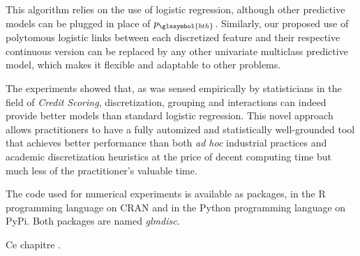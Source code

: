 This algorithm relies on the use of logistic regression, although other predictive models can be plugged in place of $p_{\glssymbol{bth}}$. Similarly, our proposed use of polytomous logistic links between each discretized feature and their respective continuous version can be replaced by any other univariate multiclass predictive model, which makes it flexible and adaptable to other problems.

The experiments showed that, as was sensed empirically by statisticians in the field of \textit{Credit Scoring}, discretization, grouping and interactions can indeed provide better models than standard logistic regression. This novel approach allows practitioners to have a fully automized and statistically well-grounded tool that achieves better performance than both \textit{ad hoc} industrial practices and academic discretization heuristics at the price of decent computing time but much less of the practitioner's valuable time.

The code used for numerical experiments is available as packages, in the \textsf{R} programming language on CRAN and in the Python programming language on PyPi. Both packages are named \textit{glmdisc}.















\bigskip

Ce chapitre .


\printbibliography[heading=subbibliography, title=Références du chapitre 4]
